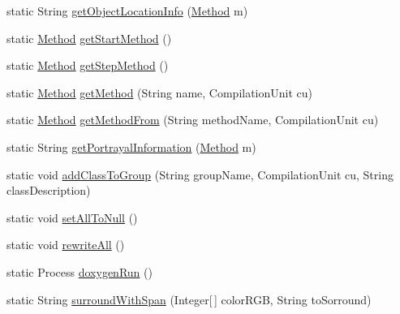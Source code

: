 \begin{DoxyCompactItemize}
static String \hyperlink{classit_1_1isislab_1_1masonhelperdocumentation_1_1analizer_1_1_global_utility_a700a92dea54f60ae25200b40247f98df}{get\-Object\-Location\-Info} (\hyperlink{classit_1_1isislab_1_1masonhelperdocumentation_1_1analizer_1_1_method}{Method} m)
\item 
static \hyperlink{classit_1_1isislab_1_1masonhelperdocumentation_1_1analizer_1_1_method}{Method} \hyperlink{classit_1_1isislab_1_1masonhelperdocumentation_1_1analizer_1_1_global_utility_a83c4fc4c4c48eee1288780fdb952f54d}{get\-Start\-Method} ()
\item 
static \hyperlink{classit_1_1isislab_1_1masonhelperdocumentation_1_1analizer_1_1_method}{Method} \hyperlink{classit_1_1isislab_1_1masonhelperdocumentation_1_1analizer_1_1_global_utility_ab8caf9838cc1fb62385c3a680b1a4e0f}{get\-Step\-Method} ()
\item 
static \hyperlink{classit_1_1isislab_1_1masonhelperdocumentation_1_1analizer_1_1_method}{Method} \hyperlink{classit_1_1isislab_1_1masonhelperdocumentation_1_1analizer_1_1_global_utility_adcb9db2ce5a150598f8a5195218048c2}{get\-Method} (String name, Compilation\-Unit cu)
\item 
static \hyperlink{classit_1_1isislab_1_1masonhelperdocumentation_1_1analizer_1_1_method}{Method} \hyperlink{classit_1_1isislab_1_1masonhelperdocumentation_1_1analizer_1_1_global_utility_ac61d34649d4edc8385c7e1069bb3be0a}{get\-Method\-From} (String method\-Name, Compilation\-Unit cu)
\item 
static String \hyperlink{classit_1_1isislab_1_1masonhelperdocumentation_1_1analizer_1_1_global_utility_ae4575ae042697933d3d9559251aed85f}{get\-Portrayal\-Information} (\hyperlink{classit_1_1isislab_1_1masonhelperdocumentation_1_1analizer_1_1_method}{Method} m)
\item 
static void \hyperlink{classit_1_1isislab_1_1masonhelperdocumentation_1_1analizer_1_1_global_utility_a796a0ed182e79b3e66fbf1d9b31919e6}{add\-Class\-To\-Group} (String group\-Name, Compilation\-Unit cu, String class\-Description)
\item 
static void \hyperlink{classit_1_1isislab_1_1masonhelperdocumentation_1_1analizer_1_1_global_utility_a345c86cd4e283bfdfab42239021173c6}{set\-All\-To\-Null} ()
\item 
static void \hyperlink{classit_1_1isislab_1_1masonhelperdocumentation_1_1analizer_1_1_global_utility_ad636deff90ff0f2349d90cc55020495a}{rewrite\-All} ()
\item 
static Process \hyperlink{classit_1_1isislab_1_1masonhelperdocumentation_1_1analizer_1_1_global_utility_a27a13fe0d5a1a7d6f90f17b33ee7fcce}{doxygen\-Run} ()
\item 
static String \hyperlink{classit_1_1isislab_1_1masonhelperdocumentation_1_1analizer_1_1_global_utility_a38ddfbe46096d9a315a9b2e5aba82569}{surround\-With\-Span} (Integer\mbox{[}$\,$\mbox{]} color\-R\-G\-B, String to\-Sorround)
\end{DoxyCompactItemize}
